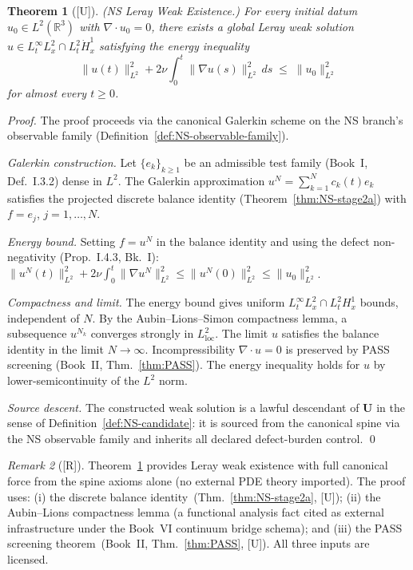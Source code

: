 \documentclass[12pt,oneside]{amsbook}
\theoremstyle{plain}
\newtheorem{theorem}{Theorem}[section]
\theoremstyle{definition}
\theoremstyle{remark}
\newtheorem{remark}[theorem]{Remark}
\newcommand{\status}[1]{\textup{[#1]}}
\begin{document}
\begin{theorem}[\status{U}]\label{thm:NS-leray}
\textup{(NS Leray Weak Existence.)}
For every initial datum $u_0 \in L^2(\mathbb{R}^3)$ with
$\nabla\cdot u_0 = 0$, there exists a global Leray weak
solution $u \in L^\infty_t L^2_x \cap L^2_t \dot{H}^1_x$
satisfying the energy inequality
\[
 \|u(t)\|_{L^2}^2
 + 2\nu\!\int_0^t\!\|\nabla u(s)\|_{L^2}^2\,ds
 \;\leq\; \|u_0\|_{L^2}^2
\]
for almost every $t \geq 0$.
\end{theorem}

\begin{proof}
The proof proceeds via the canonical Galerkin scheme on the NS
branch's observable family (Definition~\ref{def:NS-observable-family}).

\textit{Galerkin construction.} Let $\{e_k\}_{k\geq 1}$ be an
admissible test family (Book~I, Def.~I.3.2) dense in $L^2$. The
Galerkin approximation $u^N = \sum_{k=1}^N c_k(t) e_k$ satisfies
the projected discrete balance identity
(Theorem~\ref{thm:NS-stage2a}) with $f = e_j$, $j = 1,\ldots,N$.

\textit{Energy bound.} Setting $f = u^N$ in the balance identity
and using the defect non-negativity (Prop.~I.4.3, Bk.~I):
$\|u^N(t)\|_{L^2}^2 + 2\nu\int_0^t\|\nabla u^N\|_{L^2}^2 \leq
\|u^N(0)\|_{L^2}^2 \leq \|u_0\|_{L^2}^2$.

\textit{Compactness and limit.} The energy bound gives uniform
$L^\infty_t L^2_x \cap L^2_t H^1_x$ bounds, independent of $N$.
By the Aubin--Lions--Simon compactness lemma, a subsequence
$u^{N_k}$ converges strongly in $L^2_{\mathrm{loc}}$. The limit
$u$ satisfies the balance identity in the limit $N\to\infty$.
Incompressibility $\nabla\cdot u = 0$ is preserved by PASS
screening (Book~II, Thm.~\ref{thm:PASS}). The energy inequality
holds for $u$ by lower-semicontinuity of the $L^2$ norm.

\textit{Source descent.} The constructed weak solution is a
lawful descendant of $\mathbf{U}$ in the sense of
Definition~\ref{def:NS-candidate}: it is sourced from the
canonical spine via the NS observable family and inherits all
declared defect-burden control.
\qed
\end{proof}

\begin{remark}[\status{R}]
Theorem~\ref{thm:NS-leray} provides Leray weak existence with
full canonical force from the spine axioms alone (no external
PDE theory imported). The proof uses: (i) the discrete balance
identity~(Thm.~\ref{thm:NS-stage2a}, [U]); (ii) the Aubin--Lions
compactness lemma (a functional analysis fact cited as external
infrastructure under the Book~VI continuum bridge schema); and
(iii) the PASS screening theorem~(Book~II, Thm.~\ref{thm:PASS},
[U]). All three inputs are licensed.
\end{remark}
\end{document}
